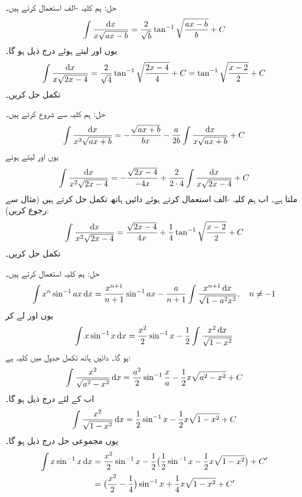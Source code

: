 حل:\quad
ہم کلیہ -الف استعمال کرتے ہیں۔
\begin{align*}
\int\frac{\dif x}{x\sqrt{ax-b}}=\frac{2}{\sqrt{b}}\tan^{-1}\sqrt{\frac{ax-b}{b}}+C
\end{align*}
یوں  اور  لیتے ہوئے درج ذیل ہو گا۔
\begin{align*}
\int \frac{\dif x}{x\sqrt{2x-4}}=\frac{2}{\sqrt{4}}\tan^{-1}\sqrt{\frac{2x-4}{4}}+C=\tan^{-1}\sqrt{\frac{x-2}{2}}+C
\end{align*}
تکمل  حل کریں۔

حل:\quad
ہم کلیہ  سے شروع کرتے ہیں۔
\begin{align*}
\int\frac{\dif x}{x^2\sqrt{ax+b}}=-\frac{\sqrt{ax+b}}{bx}-\frac{a}{2b}\int\frac{\dif x}{x\sqrt{ax+b}}+C
\end{align*}
یوں  اور  لیتے ہوئے
\begin{align*}
\int\frac{\dif x}{x^2\sqrt{2x-4}}=-\frac{\sqrt{2x-4}}{-4x}+\frac{2}{2\cdot 4}\int\frac{\dif x}{x\sqrt{2x-4}}+C
\end{align*}
ملتا ہے۔ اب ہم کلیہ -الف استعمال کرتے ہوئے دائیں ہاتھ تکمل حل کرتے ہیں (مثال  سے رجوع کریں):
\begin{align*}
\int\frac{\dif x}{x^2\sqrt{2x-4}}=\frac{\sqrt{2x-4}}{4x}+\frac{1}{4}\tan^{-1}\sqrt{\frac{x-2}{2}}+C
\end{align*}
تکمل  حل کریں۔

حل:\quad
ہم کلیہ  استعمال کرتے ہیں۔
\begin{align*}
\int x^n\sin^{-1}ax\dif x=\frac{x^{n+1}}{n+1}\sin^{-1}ax-\frac{a}{n+1}\int\frac{x^{n+1}\dif x}{\sqrt{1-a^2x^2}},\quad n\ne -1
\end{align*}
یوں  اور  لے کر
\begin{align*}
\int x\sin^{-1}x\dif x=\frac{x^2}{2}\sin^{-1}x-\frac{1}{2}\int\frac{x^2\dif x}{\sqrt{1-x^2}}
\end{align*}
ہو گا۔ دائیں ہاتھ تکمل جدول میں کلیہ  ہے:
\begin{align*}
\int \frac{x^2}{\sqrt{a^2-x^2}}\dif x=\frac{a^2}{2}\sin^{-1}\frac{x}{a}-\frac{1}{2}x\sqrt{a^2-x^2}+C
\end{align*}
اب  کے لئے درج ذیل ہو گا۔
\begin{align*}
\int \frac{x^2}{\sqrt{1-x^2}}\dif x=\frac{1}{2}\sin^{-1}x-\frac{1}{2}x\sqrt{1-x^2}+C
\end{align*}
یوں مجموعی حل درج ذیل ہو گا۔
\begin{align*}
\int x\sin^{-1}x\dif x&=\frac{x^2}{2}\sin^{-1}x-\frac{1}{2}\big(\frac{1}{2}\sin^{-1}x-\frac{1}{2}x\sqrt{1-x^2}\big)+C'\\
&=\big(\frac{x^2}{2}-\frac{1}{4}\big)\sin^{-1}x+\frac{1}{4}x\sqrt{1-x^2}+C'
\end{align*}

